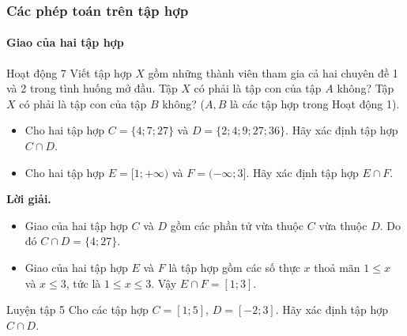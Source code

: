 \subsubsection{Các phép toán trên tập hợp}
\begin{kienthuc}
	\paragraph{Giao của hai tập hợp}
	\begin{hoatdong}{Hoạt động 7}
		Viết tập hợp $X$ gồm những thành viên tham gia cả hai chuyên đề 1 và 2 trong tình huống mở đầu. Tập $X$ có phải là tập con của tập $A$ không? Tập $X$ có phải là tập con của tập $B$ không? ($A, B$ là các tập hợp trong Hoạt động 1).
	\end{hoatdong}
	\begin{vd}
		\begin{itemize}
			\item[a)] Cho hai tập hợp $C = \{4; 7; 27\}$ và $D = \{2; 4; 9; 27; 36\}$. Hãy xác định tập hợp $C \cap D$.
			\item[b)] Cho hai tập hợp $E = [1; +\infty)$ và $F = (-\infty; 3]$. Hãy xác định tập hợp $E \cap F$.
		\end{itemize}
		\textbf{Lời giải.}
		\begin{itemize}
			\item[a)] Giao của hai tập hợp $C$ và $D$ gồm các phần tử vừa thuộc $C$ vừa thuộc $D$. Do đó $C \cap D = \{4; 27\}$.
			\item[b)] Giao của hai tập hợp $E$ và $F$ là tập hợp gồm các số thực $x$ thoả mãn $1 \le x$ và $x \le 3$, tức là $1 \le x \le 3$. Vậy $E \cap F = [1; 3]$.
		\end{itemize}
	\end{vd}
	\begin{hoatdong}{Luyện tập 5}
		Cho các tập hợp $C = [1; 5]$, $D = [-2; 3]$. Hãy xác định tập hợp $C \cap D$.
	\end{hoatdong}


\end{kienthuc}
